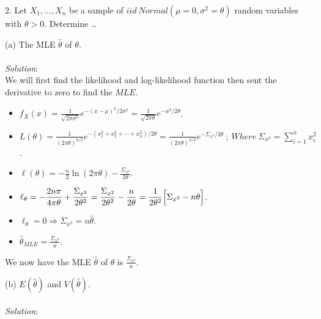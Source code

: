 \documentclass[12pt]{article}
\newcommand{\XB}{\color{black}}
\newcommand{\XBB}{\color{blue}}
\newcommand{\ds}{\displaystyle}
\begin{document}
2. Let $ X_{1}, \dots , X_{n} $ be a sample of $ iid \ Normal(\mu = 0, \sigma^{2} = \theta) $ random variables
with $ \theta > 0 $. Determine \dots \\

\XBB\hrulefill\XB 
\vspace{5mm} 

(a) The MLE $ \hat{\theta} $ of $ \theta $. \\
\vspace{2.5mm} \\
\textit{Solution}:
\vspace{2.5mm} \\

\noindent
We will first find the likelihood and log-likelihood function then sent the derivative to zero to find the $ MLE $. \\

\begin{itemize}
    \item $ \ds f_{X}(x) = \frac{1}{\sqrt{2\pi\sigma^{2}}}e^{-(x - \mu)^{2}/2\sigma^{2}} = \frac{1}{\sqrt{2\pi\theta}}e^{-x^{2}/2\theta} $.
    \item $ \ds L(\theta) = \frac{1}{(2\pi\theta)^{n/2}}e^{-(x_{1}^{2} + x_{2}^{2} + \cdots + x_{n}^{2})/2\theta} = \frac{1}{(2\pi\theta)^{n/2}}e^{-\Sigma_{x^{2}}/2\theta} \ ; \ Where \ \Sigma_{x^{2}} = \sum_{i=1}^{n} x_{i}^{2} $.
    \item $ \ds \ell(\theta) = -\frac{n}{2}\ln(2\pi\theta) - \frac{\Sigma_{x^{2}}}{2\theta} $.
    \item $ \ds \ell_{\theta} = -\frac{2n\pi}{4\pi\theta} + \frac{\Sigma_{x^{2}}}{2\theta^{2}} = \frac{\Sigma_{x^{2}}}{2\theta^{2}} -\frac{n}{2\theta} = \frac{1}{2\theta^{2}}\Bigl[ \Sigma_{x^{2}} - n\theta \Bigr] $.
    \item $ \ds \ell_{\theta} = 0 \Rightarrow \Sigma_{x^{2}} = n\hat{\theta} $.
    \item $ \ds \hat{\theta}_{MLE} = \frac{\Sigma_{x^{2}}}{n} $.
\end{itemize}

\noindent
We now have the MLE $ \hat{\theta} $ of $ \theta $ is $ \ds \frac{\Sigma_{x^{2}}}{n} $. \\

\vspace{2.5mm}

(b) $ E(\hat{\theta}) $ and $ V(\hat{\theta}) $. \\
\vspace{2.5mm} \\
\textit{Solution}:
\vspace{2.5mm} \\
\end{document}
